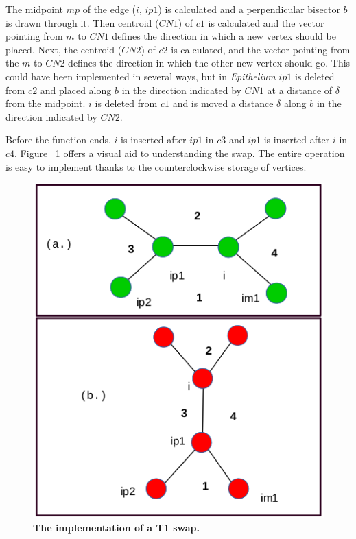The midpoint $mp$ of the edge ($i$, $ip1$) is calculated and a perpendicular bisector $b$ is drawn through it. Then centroid ($CN1$) of $c1$ is calculated and the vector pointing from $m$ to $CN1$ defines the direction in which a new vertex should be placed. Next, the centroid ($CN2$) of $c2$ is calculated, and the vector pointing from the $m$ to $CN2$ defines the direction in which the other new vertex should go. This could have been implemented in several ways, but in \emph{Epithelium} $ip1$ is deleted from $c2$ and placed along $b$ in the direction indicated by $CN1$ at a distance of $\delta$ from the midpoint. $i$ is deleted from $c1$ and is moved a distance $\delta$ along $b$ in the direction indicated by $CN2$.

Before the function ends, $i$ is inserted after $ip1$ in $c3$ and $ip1$ is inserted after $i$ in $c4$. Figure ~\ref{fig:t1pdf} offers a visual aid to understanding the swap. The entire operation is easy to implement thanks to the counterclockwise storage of vertices.

\begin{figure}
\centering
\includegraphics[height=0.5\textheight, keepaspectratio]{../diagrams/t1pdf.png}
\caption[\textbf{Implementation of a T1 swap.}]{\textbf{The implementation of a T1 swap.}}
\label{fig:t1pdf}
\end{figure}
